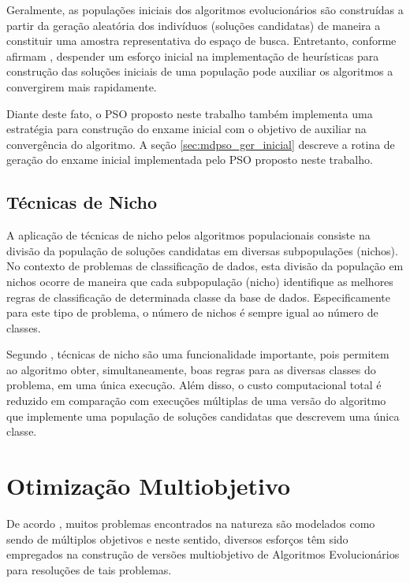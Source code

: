 \documentclass[
	12pt,				%
	openany,			%
	oneside,	
	a4paper,			%
	brazil,				%
	]{unimontes-ppgmsc-abntex2}
\begin{document}
Geralmente, as populações iniciais dos algoritmos evolucionários são construídas a partir da geração aleatória dos indivíduos (soluções candidatas) de maneira a constituir uma amostra representativa do espaço de busca. Entretanto, conforme afirmam , despender um esforço inicial na implementação de heurísticas para construção das soluções iniciais de uma população pode auxiliar os algoritmos a convergirem mais rapidamente. 

Diante deste fato, o PSO proposto neste trabalho também implementa uma estratégia para construção do enxame inicial com o objetivo de auxiliar na convergência do algoritmo. A seção \ref{sec:mdpso_ger_inicial} descreve a rotina de geração do enxame inicial implementada pelo PSO proposto neste trabalho.

\subsection{Técnicas de Nicho}
\label{sec:tec_nicho}

A aplicação de técnicas de nicho pelos algoritmos populacionais consiste na divisão da população de soluções candidatas em diversas subpopulações (nichos). No contexto de problemas de classificação de dados, esta divisão da população em nichos ocorre de maneira que cada subpopulação (nicho) identifique as melhores regras de classificação de determinada classe da base de dados. Especificamente para este tipo de problema, o número de nichos é sempre igual ao número de classes.

Segundo , técnicas de nicho são uma funcionalidade importante, pois permitem ao algoritmo obter, simultaneamente, boas regras para as diversas classes do problema, em uma única execução. Além disso, o custo computacional total é reduzido em comparação com execuções múltiplas de uma versão do algoritmo que implemente uma população de soluções candidatas que descrevem uma única classe.

\section{Otimização Multiobjetivo}
\label{sec:multi_obj}

De acordo , muitos problemas encontrados na natureza são modelados como sendo de múltiplos objetivos e neste sentido, diversos esforços têm sido empregados na construção de versões multiobjetivo de Algoritmos Evolucionários para resoluções de tais problemas.
\end{document}
